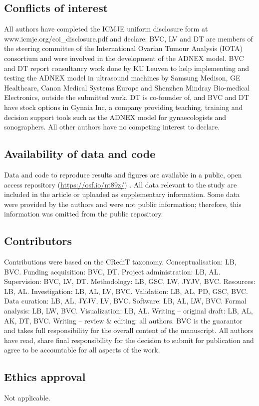 \subsection*{Conflicts of interest}
All authors have completed the ICMJE uniform disclosure form at
www.icmje.org/coi\_disclosure.pdf and declare: BVC, LV and DT are members of the
steering committee of the International Ovarian Tumour Analysis (\gls{IOTA}) consortium and
were involved in the development of the \gls{ADNEX} model. BVC and DT report consultancy
work done by KU Leuven to help implementing and testing the \gls{ADNEX} model in ultrasound
machines by Samsung Medison, GE Healthcare, Canon Medical Systems Europe and Shenzhen
Mindray Bio-medical Electronics, outside the submitted work. DT is co-founder of,
and BVC and DT have stock options in Gynaia Inc, a company providing teaching,
training and decision support tools such as the \gls{ADNEX} model for gynaecologists and
sonographers. All other authors have no competing interest to declare.

\subsection*{Availability of data and code}
Data and code to reproduce results and figures are available in a public, open access
repository (\url{https://osf.io/nt89z/}) \cite{barrenadaOSFADNEXVs2024}. All data
relevant to the study are included in the article or uploaded as supplementary
information. Some data were provided by the authors and were not public information;
therefore, this information was omitted from the public repository.

\subsection*{Contributors}
Contributions were based on the CRediT taxonomy. Conceptualisation: LB, BVC. Funding
acquisition: BVC, DT. Project administration: LB, AL. Supervision: BVC, LV, DT.
Methodology: LB, GSC, LW, JYJV, BVC. Resources: LB, AL. Investigation: LB, AL, LV,
BVC. Validation: LB, AL, PD, GSC, BVC. Data curation: LB, AL, JYJV, LV, BVC.
Software: LB, AL, LW, BVC. Formal analysis: LB, LW, BVC. Visualization: LB, AL.
Writing -- original draft: LB, AL, AK, DT, BVC. Writing -- review \& editing: all
authors. BVC is the guarantor and takes full responsibility for the overall content
of the manuscript. All authors have read, share final responsibility for the decision
to submit for publication and agree to be accountable for all aspects of the work.

\subsection*{Ethics approval}
Not applicable.
